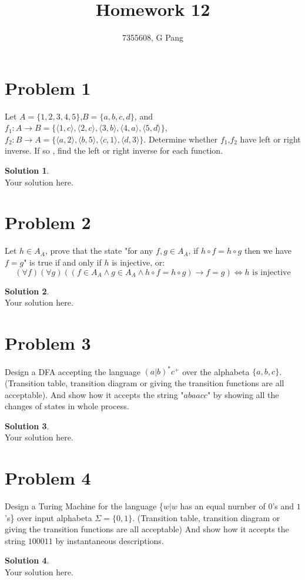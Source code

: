 \documentclass[a4paper,UTF8]{article}
\theoremstyle{definition}
\newtheorem*{solution}{Solution}
\begin{document}
\title{Homework 12}
\author{7355608, G Pang}
\maketitle

\section*{Problem 1}
Let $A=\{1,2,3,4,5\}$,$B=\{a,b,c,d\}$, and $f_1:A\rightarrow B =\{\langle 1,c \rangle,\langle 2,c\rangle,\langle 3,b\rangle ,\langle 4,a\rangle,\langle 5,d\rangle\}$, $f_2:B\rightarrow A=\{\langle a,2\rangle,\langle b,5\rangle,\langle c,1\rangle,\langle d,3\rangle \}$. Determine whether $f_1$,$f_2$ have left or right inverse. If so , find the left or right inverse for each function.
\begin{solution}
	~\\
	Your solution here.
\end{solution}

\section*{Problem 2}
Let $h \in A_A$, prove that the state "for any $f,g\in A_A$, if $h\circ f =h \circ g$ then we have $f=g$" is true if and only if $h$ is injective, or:
$$(\forall f)(\forall g)( (f\in A_A \land g\in A_A \land h\circ f =h \circ g) \rightarrow f=g) \Leftrightarrow h \text{ is injective}$$
\begin{solution}
	~\\
	Your solution here.
\end{solution}

\section*{Problem 3}
Design a DFA accepting the language $(a|b)^*c^+$ over the alphabeta $\{a,b,c\}$. (Transition table, transition diagram or giving the transition functions are all acceptable). And show how it accepts the string "$abaacc$" by showing all the changes of states in whole process.
\begin{solution}
	~\\
	Your solution here.
\end{solution}


\section*{Problem 4}
Design a Turing Machine for the language \{$w|w$ has an equal nurnber of $0$'s and $1$'s\} over input alphabeta $\Sigma = \{0,1\}$. (Transition table, transition diagram or giving the transition functions are all acceptable) And show how it accepts the string $100011$ by instantaneous descriptions.
\begin{solution}
	~\\
	Your solution here.
\end{solution}
\end{document}
